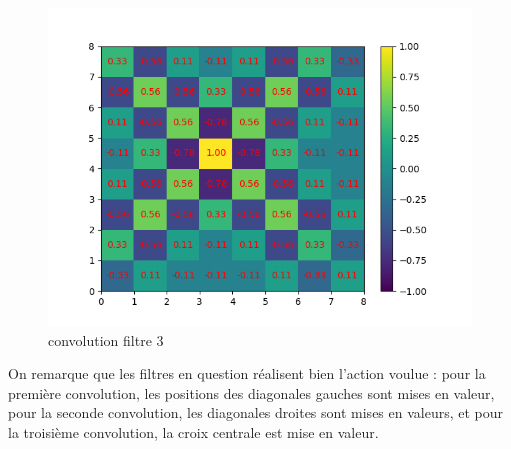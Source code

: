 \begin{figure}[h]
        \includegraphics[width=\textwidth]{img/cnn_exemple/cross/convolution_filtre_3.png}
        \caption{convolution filtre 3}
    \endminipage
\end{figure}

On remarque que les filtres en question réalisent bien l'action voulue : pour la première convolution, les positions des 
diagonales gauches sont mises en valeur, pour la seconde convolution, les diagonales droites sont mises en valeurs, 
et pour la troisième convolution, la croix centrale est mise en valeur.

